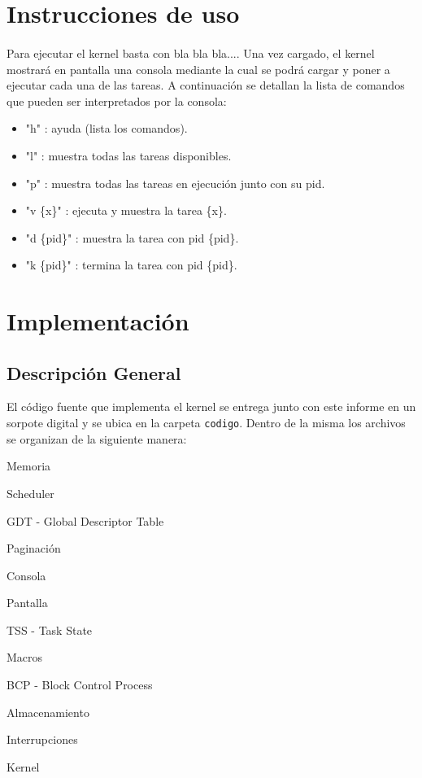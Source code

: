 \documentclass[11pt, a4paper]{article}
\begin{document}
		
\section{Instrucciones de uso}
\paragraph{}
Para ejecutar el kernel basta con bla bla bla.... Una vez cargado, el kernel mostrará en pantalla una consola mediante la cual se podrá cargar y poner a ejecutar cada una de las tareas. A continuación se detallan la lista de comandos que pueden ser interpretados por la consola:
\begin{itemize}
    \item "h" : ayuda (lista los comandos).
 	\item "l" : muestra todas las tareas disponibles.
 	\item "p" : muestra todas las tareas en ejecuci\'on junto con su pid.
 	\item "v \{x\}" : ejecuta y muestra la tarea \{x\}.
 	\item "d \{pid\}" : muestra la tarea con pid \{pid\}.
 	\item "k \{pid\}" : termina la tarea con pid \{pid\}.

\end{itemize}


\section{Implementación}
	\subsection{Descripción General}
	El código fuente que implementa el kernel se entrega junto con este informe en un sorpote digital y se ubica en la carpeta \texttt{codigo}. Dentro de la misma los archivos se organizan de la siguiente manera:
	\begin{center}
		\begin{shortitemize}
			\setlength{\shortitemwidth}{200pt}
			\item Memoria
			\item Scheduler
			\item GDT - Global Descriptor Table
			\item Paginación				
			\item Consola
			\item Pantalla
			\item TSS - Task State
			\item Macros
			\item BCP - Block Control Process
			\item Almacenamiento
			\item Interrupciones							
			\item Kernel
		\end{shortitemize}
	\end{center}		
\end{document}

